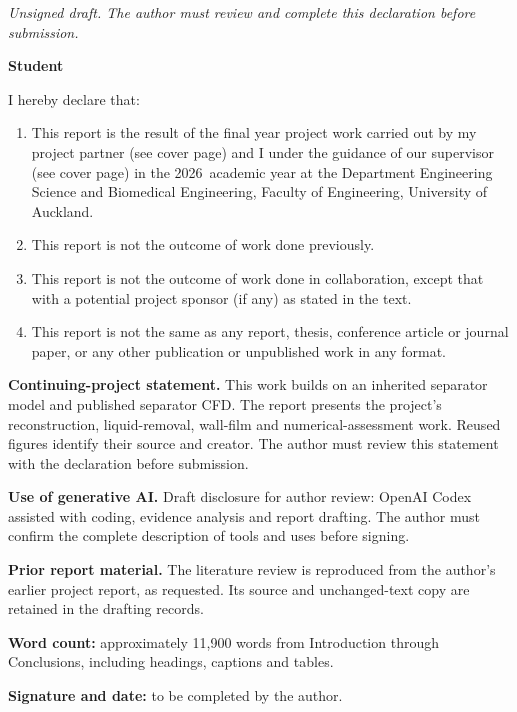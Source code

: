 \emph{Unsigned draft. The author must review and complete this declaration before submission.}

\textbf{Student}

I hereby declare that:

\begin{enumerate}
\def\labelenumi{\arabic{enumi}.}
\item
  This report is the result of the final year project work carried out by my project partner (see cover page) and I under the guidance of our supervisor (see cover page) in the 2026~academic year at the Department Engineering Science and Biomedical Engineering, Faculty of Engineering, University of Auckland.
\item
  This report is not the outcome of work done previously.
\item
  This report is not the outcome of work done in collaboration, except that with a potential project sponsor (if any) as stated in the text.
\item
  This report is not the same as any report, thesis, conference article or journal paper, or any other publication or unpublished work in any format.
\end{enumerate}

\textbf{Continuing-project statement.} This work builds on an inherited separator model and published separator CFD. The report presents the project's reconstruction, liquid-removal, wall-film and numerical-assessment work. Reused figures identify their source and creator. The author must review this statement with the declaration before submission.

\textbf{Use of generative AI.} Draft disclosure for author review: OpenAI Codex assisted with coding, evidence analysis and report drafting. The author must confirm the complete description of tools and uses before signing.

\textbf{Prior report material.} The literature review is reproduced from the author's earlier project report, as requested. Its source and unchanged-text copy are retained in the drafting records.

\textbf{Word count:} approximately 11,900 words from Introduction through Conclusions, including headings, captions and tables.

\textbf{Signature and date:} to be completed by the author.
